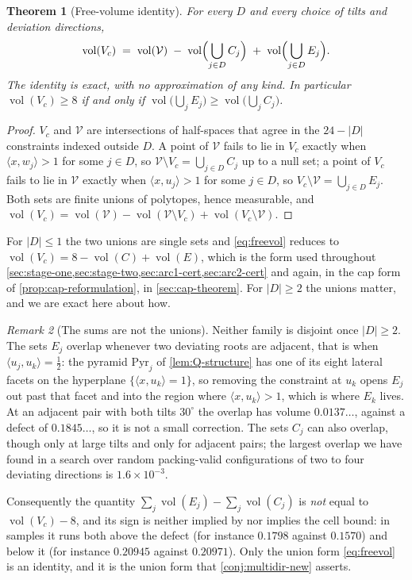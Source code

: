 \documentclass[11pt,reqno]{amsart}
\renewcommand{\_}{\origunderscore\allowbreak}
\numberwithin{equation}{section}
\theoremstyle{plain}
\newtheorem{thm}{Theorem}[section]
\theoremstyle{definition}
\theoremstyle{remark}
\newtheorem{remark}[thm]{Remark}
\newcommand{\VCell}{\mathcal{V}}             %
\newcommand{\base}{u}                        %
\DeclareMathOperator{\vol}{vol}
\begin{document}
\begin{thm}[Free-volume identity]\label{thm:freevol-new}
For every $D$ and every choice of tilts and deviation directions,
\begin{equation}\label{eq:freevol}
  \vol(V_c) \;=\; \vol(\VCell)
  \;-\;\vol\Bigl(\bigcup_{j\in D}C_j\Bigr)
  \;+\;\vol\Bigl(\bigcup_{j\in D}E_j\Bigr).
\end{equation}
The identity is exact, with no approximation of any kind. In particular
$\vol(V_c)\ge8$ if and only if
$\vol\bigl(\bigcup_{j}E_j\bigr)\ge\vol\bigl(\bigcup_{j}C_j\bigr)$.
\end{thm}

\begin{proof}
$V_c$ and $\VCell$ are intersections of half-spaces that agree in the
$24-|D|$ constraints indexed outside $D$. A point of $\VCell$ fails to
lie in $V_c$ exactly when $\langle x,w_j\rangle>1$ for some $j\in D$, so
$\VCell\setminus V_c=\bigcup_{j\in D}C_j$ up to a null set; a point of
$V_c$ fails to lie in $\VCell$ exactly when $\langle
x,\base_j\rangle>1$ for some $j\in D$, so $V_c\setminus\VCell=\bigcup_{j\in
D}E_j$. Both sets are finite unions of polytopes, hence measurable, and
$\vol(V_c)=\vol(\VCell)-\vol(\VCell\setminus V_c)+\vol(V_c\setminus\VCell)$.
\end{proof}

For $|D|\le1$ the two unions are single sets and \eqref{eq:freevol}
reduces to $\vol(V_c)=8-\vol(C)+\vol(E)$, which is the form used
throughout \cref{sec:stage-one,sec:stage-two,sec:arc1-cert,sec:arc2-cert}
and again, in the cap form of \cref{prop:cap-reformulation}, in
\cref{sec:cap-theorem}. For $|D|\ge2$ the unions matter, and we are exact here about how.

\begin{remark}[The sums are not the unions]\label{rem:sums-not-unions}
Neither family is disjoint once $|D|\ge2$. The sets $E_j$ overlap
whenever two deviating roots are adjacent, that is when
$\langle\base_j,\base_k\rangle=\tfrac12$: the pyramid $\mathrm{Pyr}_j$ of
\cref{lem:Q-structure} has one of its eight lateral facets on the
hyperplane $\{\langle x,\base_k\rangle=1\}$, so removing the constraint
at $\base_k$ opens $E_j$ out past that facet and into the region where
$\langle x,\base_k\rangle>1$, which is where $E_k$ lives. At an adjacent
pair with both tilts $30^\circ$ the overlap has volume $0.0137\ldots$,
against a defect of $0.1845\ldots$, so it is not a small correction. The
sets $C_j$ can also overlap, though only at large tilts and only for
adjacent pairs; the largest overlap we have found in a search over
random packing-valid configurations of two to four deviating directions
is $1.6\times10^{-3}$.

Consequently the quantity $\sum_j\vol(E_j)-\sum_j\vol(C_j)$ is
\emph{not} equal to $\vol(V_c)-8$, and its sign is neither implied by
nor implies the cell bound: in samples it runs both above the defect
(for instance $0.1798$ against $0.1570$) and below it (for instance
$0.20945$ against $0.20971$). Only the union form \eqref{eq:freevol} is
an identity, and it is the union form that
\cref{conj:multidir-new} asserts.
\end{remark}
\end{document}

